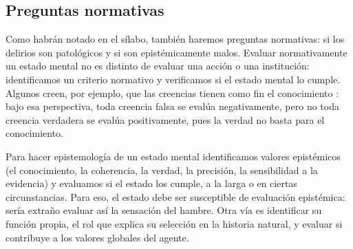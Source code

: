 \documentclass[a4paper,nofonts,justified]{tufte-handout}
\begin{document}
\subsection{Preguntas normativas}
Como habrán notado en el sílabo, también haremos preguntas normativas: si los delirios son patológicos y si son epistémicamente malos. Evaluar normativamente un estado mental no es distinto de evaluar una acción o una institución: identificamos un criterio normativo y verificamos si el estado mental lo cumple. Algunos creen, por ejemplo, que las creencias tienen como fin el conocimiento \citep{williamson2000}: bajo esa perspectiva, toda creencia falsa se evalúa negativamente, pero no toda creencia verdadera se evalúa positivamente, pues la verdad no basta para el conocimiento.

Para hacer epistemología de un estado mental identificamos valores epistémicos (el conocimiento, la coherencia, la verdad, la precisión, la sensibilidad a la evidencia) y evaluamos si el estado los cumple, a la larga o en ciertas circunstancias. Para eso, el estado debe ser susceptible de evaluación epistémica: sería extraño evaluar así la sensación del hambre. Otra vía es identificar su función propia, el rol que explica su selección en la historia natural, y evaluar si contribuye a los valores globales del agente.



\end{document}
